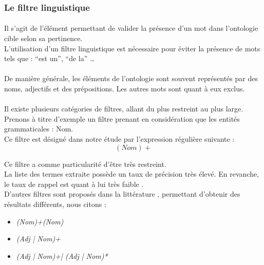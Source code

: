 \documentclass[12pt, a4paper, oneside]{book}
\begin{document}
\subsubsection{Le filtre linguistique}

\paragraph{}
Il s'agit de l'élément permettant de valider la présence d'un mot dans l'ontologie cible selon sa pertinence.\\ 
L'utilisation d'un filtre linguistique est nécessaire pour éviter la présence de mots tels que  : “est un”, “de la” … 
\paragraph{}
De manière générale, les éléments de l'ontologie sont souvent représentés par des noms, adjectifs et des prépositions. Les autres mots sont quant à eux exclus.
\paragraph{}
Il existe plusieurs catégories de filtres, allant du plus restreint au plus large.\\
Prenons à titre d'exemple un filtre prenant en considération que les entités grammaticales : Nom.\\
Ce filtre est désigné dans notre étude par l'expression régulière suivante : 
$$(Nom)+ $$

Ce filtre a comme particularité d'être très restreint.\\

La liste des termes extraite possède un taux de précision très élevé. En revanche, le taux de rappel est quant à lui très faible \citep{regex}. \\ 

D'autres filtres sont proposés dans la littérature \citep{regex}, permettant d'obtenir des résultats différents, nous citons : \\
\begin{itemize}
\item \textit{(Nom)+(Nom)} \\
\item \textit{(Adj | Nom)+} \\
\item \textit{(Adj | Nom)+| (Adj | Nom)*} \\
\end{itemize}
\end{document}
